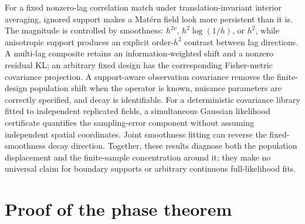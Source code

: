 \documentclass[11pt]{article}
\theoremstyle{remark}
\begin{document}
For a fixed nonzero-lag correlation match under translation-invariant interior
averaging, ignored support makes a Mat\'ern field look more persistent than it
is.  The magnitude is controlled by smoothness: \(h^{2\nu}\),
\(h^2\log(1/h)\), or \(h^2\), while anisotropic support produces an explicit
order-\(h^2\) contrast between lag directions. A multi-lag composite retains
an information-weighted shift and a nonzero residual KL; an arbitrary fixed
design has the corresponding Fisher-metric covariance projection. A support-aware observation
covariance removes the finite-design population shift when the operator is
known, nuisance parameters are correctly specified, and decay is identifiable.
For a deterministic covariance library fitted to independent replicated
fields, a simultaneous Gaussian likelihood certificate quantifies the
sampling-error component without assuming independent spatial coordinates.
Joint smoothness fitting can reverse the fixed-smoothness decay direction.
Together, these results diagnose both the population displacement and the
finite-sample concentration around it; they make no universal claim for
boundary supports or arbitrary continuous full-likelihood fits.

\appendix
\section{Proof of the phase theorem}
\end{document}
